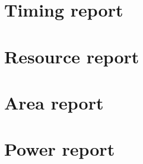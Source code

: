 
\newpage
\begin{appendix}
\section{Timing report}

\section{Resource report}

\section{Area report}

\section{Power report}

\end{appendix}

